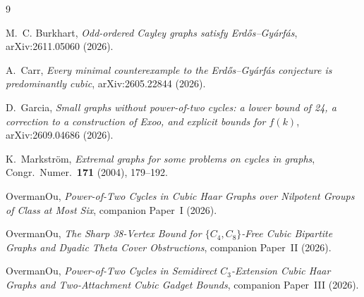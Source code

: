 \documentclass[11pt]{amsart}
\theoremstyle{definition}
\theoremstyle{remark}
\begin{document}
\begin{thebibliography}{9}

M.~C. Burkhart, \emph{Odd-ordered Cayley graphs satisfy Erd\H{o}s--Gy\'arf\'as}, arXiv:2611.05060 (2026).

A.~Carr, \emph{Every minimal counterexample to the Erd\H{o}s--Gy\'arf\'as conjecture is predominantly cubic}, arXiv:2605.22844 (2026).

D.~Garcia, \emph{Small graphs without power-of-two cycles: a lower bound of 24, a correction to a construction of Exoo, and explicit bounds for $f(k)$}, arXiv:2609.04686 (2026).

K.~Markstr\"om, \emph{Extremal graphs for some problems on cycles in graphs}, Congr.\ Numer.\ \textbf{171} (2004), 179--192.

OvermanOu, \emph{Power-of-Two Cycles in Cubic Haar Graphs over Nilpotent Groups of Class at Most Six}, companion Paper~I (2026).

OvermanOu, \emph{The Sharp 38-Vertex Bound for $\{C_4, C_8\}$-Free Cubic Bipartite Graphs and Dyadic Theta Cover Obstructions}, companion Paper~II (2026).

OvermanOu, \emph{Power-of-Two Cycles in Semidirect $C_3$-Extension Cubic Haar Graphs and Two-Attachment Cubic Gadget Bounds}, companion Paper~III (2026).

\end{thebibliography}
\end{document}
